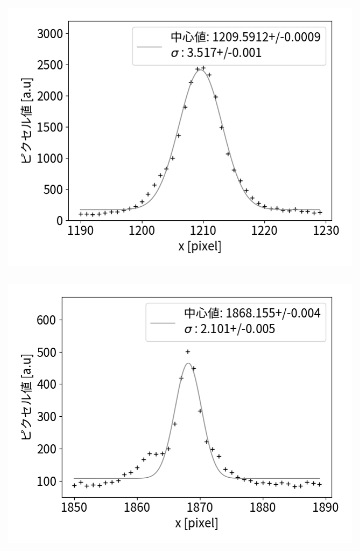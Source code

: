 \documentclass[a4paper,11pt,uplatex]{jsbook}
\begin{document}
\begin{figure}[h]
  \centering
  \begin{subfigure}[h]{0.33\linewidth}
    \centering
    \includegraphics[width=\linewidth]{image/4-fpeak.png}
  \end{subfigure}
  \hfill
  \begin{subfigure}[h]{0.33\linewidth}
    \centering
    \includegraphics[width=\linewidth]{image/4-speak.png}
  \end{subfigure}
  \hfill
  \begin{subfigure}[h]{0.33\linewidth}
    \centering

\end{subfigure}
\end{figure}
\end{document}
